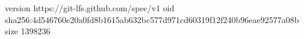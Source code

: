 version https://git-lfs.github.com/spec/v1
oid sha256:4d546760e20a0fd8b1615ab632bc577d971cd60319f12f240b96eae92577a08b
size 1398236
